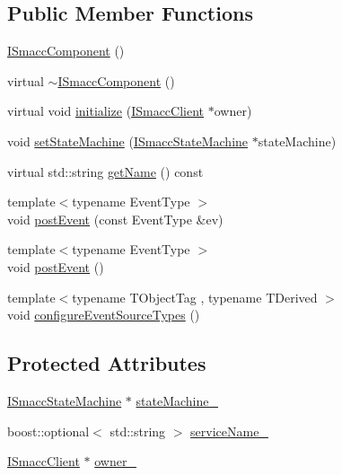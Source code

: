 \subsection*{Public Member Functions}
\begin{DoxyCompactItemize}
\item 
\hyperlink{classsmacc_1_1ISmaccComponent_a43952d7269ddb81d017a80f018fe502e}{I\+Smacc\+Component} ()
\item 
virtual \hyperlink{classsmacc_1_1ISmaccComponent_a46f5cfc6a308de938b6ee3a5e80a8fe9}{$\sim$\+I\+Smacc\+Component} ()
\item 
virtual void \hyperlink{classsmacc_1_1ISmaccComponent_a3378552cb1a86aa26a07c0edc057448b}{initialize} (\hyperlink{classsmacc_1_1ISmaccClient}{I\+Smacc\+Client} $\ast$owner)
\item 
void \hyperlink{classsmacc_1_1ISmaccComponent_afe57665a6982475e8f9c2a5885e986e1}{set\+State\+Machine} (\hyperlink{classsmacc_1_1ISmaccStateMachine}{I\+Smacc\+State\+Machine} $\ast$state\+Machine)
\item 
virtual std\+::string \hyperlink{classsmacc_1_1ISmaccComponent_aa314809a7fd3516461e31cc120d0cfe7}{get\+Name} () const 
\item 
{\footnotesize template$<$typename Event\+Type $>$ }\\void \hyperlink{classsmacc_1_1ISmaccComponent_a687dead5b87a3b9781b9bf6ab0b7afa5}{post\+Event} (const Event\+Type \&ev)
\item 
{\footnotesize template$<$typename Event\+Type $>$ }\\void \hyperlink{classsmacc_1_1ISmaccComponent_a84455564c2c4b90be58e900050232722}{post\+Event} ()
\item 
{\footnotesize template$<$typename T\+Object\+Tag , typename T\+Derived $>$ }\\void \hyperlink{classsmacc_1_1ISmaccComponent_ad1c9ede43be1f83c10c6e7a2e14db8d3}{configure\+Event\+Source\+Types} ()
\end{DoxyCompactItemize}
\subsection*{Protected Attributes}
\begin{DoxyCompactItemize}
\item 
\hyperlink{classsmacc_1_1ISmaccStateMachine}{I\+Smacc\+State\+Machine} $\ast$ \hyperlink{classsmacc_1_1ISmaccComponent_ae3f37acc1679f79299b86872d4b1f80f}{state\+Machine\+\_\+}
\item 
boost\+::optional$<$ std\+::string $>$ \hyperlink{classsmacc_1_1ISmaccComponent_a25de6450f3cd86d0e93bf356b5b43595}{service\+Name\+\_\+}
\item 
\hyperlink{classsmacc_1_1ISmaccClient}{I\+Smacc\+Client} $\ast$ \hyperlink{classsmacc_1_1ISmaccComponent_a909590e672450ce0eb0d8facb45c737a}{owner\+\_\+}
\end{DoxyCompactItemize}
